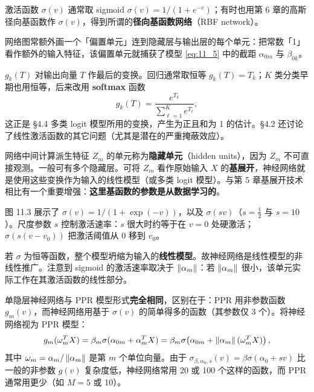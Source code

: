 \begin{remark}[激活函数与偏置]
激活函数 $\sigma(v)$ 通常取 sigmoid $\sigma(v) = 1/(1+e^{-v})$；有时也用第 6 章的高斯径向基函数作 $\sigma(v)$，得到所谓的\textbf{径向基函数网络}（RBF network）。

网络图常额外画一个「偏置单元」连到隐藏层与输出层的每个单元：把常数「1」看作额外的输入特征，该偏置单元就捕获了模型 \ref{eq:11_5} 中的截距 $\alpha_{0m}$ 与 $\beta_{0k}$。
\end{remark}

\begin{remark}[输出函数 $g_k(T)$]
$g_k(T)$ 对输出向量 $T$ 作最后的变换。回归通常取恒等 $g_k(T)=T_k$；$K$ 类分类早期也用恒等，后来改用 \textbf{softmax} 函数
\begin{equation}
g_k(T) = \frac{e^{T_k}}{\sum_{\ell=1}^{K} e^{T_\ell}}, \label{eq:11_6}
\end{equation}
这正是 §4.4 多类 logit 模型所用的变换，产生为正且和为 1 的估计。§4.2 还讨论了线性激活函数的其它问题（尤其是潜在的严重掩蔽效应）。
\end{remark}

\begin{remark}[隐藏单元 = 学习参数的基展开]
网络中间计算派生特征 $Z_m$ 的单元称为\textbf{隐藏单元}（hidden units），因为 $Z_m$ 不可直接观测。一般可有多个隐藏层。可将 $Z_m$ 看作原始输入 $X$ 的\textbf{基展开}，神经网络就是使用这些变换作为输入的线性模型（或多类 logit 模型）。与第 5 章基展开技术相比有一个重要增强：\textbf{这里基函数的参数是从数据学习的}。
\end{remark}

\begin{remark}
图 11.3 展示了 $\sigma(v) = 1/(1+\exp(-v))$，以及 $\sigma(sv)$（$s=\frac12$ 与 $s=10$）。尺度参数 $s$ 控制激活速率：$s$ 很大时约等于在 $v=0$ 处硬激活；$\sigma(s(v-v_0))$ 把激活阈值从 0 移到 $v_0$。

若 $\sigma$ 为恒等函数，整个模型坍缩为输入的\textbf{线性模型}。故神经网络是线性模型的非线性推广。注意到 sigmoid 的激活速率取决于 $\left\lVert\alpha_m\right\rVert$：若 $\left\lVert\alpha_m\right\rVert$ 很小，该单元实际工作在其激活函数的线性部分。
\end{remark}

\begin{remark}
单隐层神经网络与 PPR 模型形式\textbf{完全相同}，区别在于：PPR 用非参数函数 $g_m(v)$，而神经网络用基于 $\sigma(v)$ 的简单得多的函数（其参数仅 3 个）。将神经网络视为 PPR 模型：
\begin{equation}
g_m(\omega_m^T X) = \beta_m \sigma(\alpha_{0m} + \alpha_m^T X)
= \beta_m \sigma\!\left( \alpha_{0m} + \left\lVert\alpha_m\right\rVert(\omega_m^T X) \right), \label{eq:11_7}
\end{equation}
其中 $\omega_m = \alpha_m / \left\lVert\alpha_m\right\rVert$ 是第 $m$ 个单位向量。由于 $\sigma_{\beta,\alpha_0,s}(v) = \beta\sigma(\alpha_0 + sv)$ 比一般的非参数 $g(v)$ 复杂度低，神经网络常用 20 或 100 个这样的函数，而 PPR 通常用更少（如 $M=5$ 或 10）。
\end{remark}

